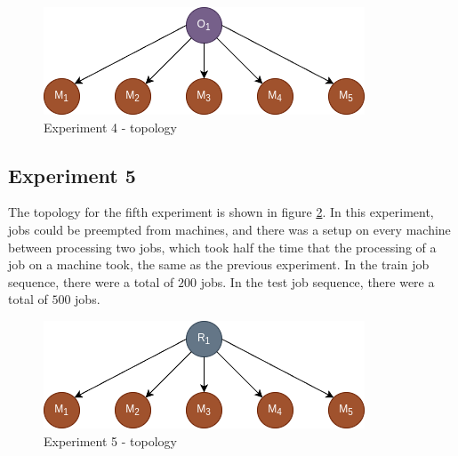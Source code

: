\begin{figure}[!htbp]
	\centering
	\includegraphics[scale=0.6]{../images/experiment4_topology.png}
	\caption{Experiment 4 - topology}
    \label{fig:experiment4_topology}
\end{figure}

\subsection{Experiment 5}

The topology for the fifth experiment is shown in figure \ref{fig:experiment5_topology}. In this experiment, jobs could be preempted from machines, and there was a setup on every machine between processing two jobs, which took half the time that the processing of a job on a machine took, the same as the previous experiment. In the train job sequence, there were a total of $200$ jobs. In the test job sequence, there were a total of $500$ jobs.

\begin{figure}[!htbp]
	\centering
	\includegraphics[scale=0.6]{../images/experiment5_topology.png}
	\caption{Experiment 5 - topology}
    \label{fig:experiment5_topology}
\end{figure}